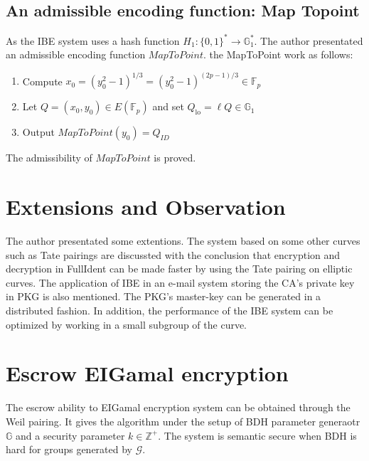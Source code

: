 \documentclass[11pt,en]{elegantpaper}
\begin{document}
\subsection{An admissible encoding function: Map Topoint}
As the IBE system uses a hash function $H_1:\{0,1\}^*\rightarrow\mathbb{G}_1^*$. The author presentated an admissible encoding function $MapToPoint$.
the MapToPoint work as follows:
\begin{enumerate}
	\item Compute $x_{0}=\left(y_{0}^{2}-1\right)^{1 / 3}=\left(y_{0}^{2}-1\right)^{(2 p-1) / 3} \in \mathbb{F}_{p}$
	\item Let $Q=\left(x_{0}, y_{0}\right) \in E\left(\mathbb{F}_{p}\right)$ and set $Q_{\mathrm{lo}}=\ell Q \in \mathbb{G}_{1}$
	\item Output $MapToPoint(y_0)=Q_{ID}$ 
\end{enumerate}
The admissibility of $MapToPoint$ is proved.

\section{Extensions and Observation}
The author presentated some extentions. The system based on some other curves such as Tate pairings are discussted with the conclusion that encryption and decryption in FullIdent can be made faster by using the Tate pairing on elliptic curves. The application of IBE in an e-mail system storing the CA's private key in PKG is also mentioned. The PKG's master-key can be generated in a distributed fashion. In addition, the performance of the IBE system can be optimized by working in a small subgroup of the curve. 

\section {Escrow EIGamal encryption}
The escrow ability to EIGamal encryption system can be obtained through the Weil pairing. It gives the algorithm under the setup of BDH parameter generaotr $\mathbb{G}$ and a security parameter $k \in \mathbb{Z}^+$. The system is semantic secure when BDH is hard for groups generated by $\mathcal{G}$.
%
\end{document}
